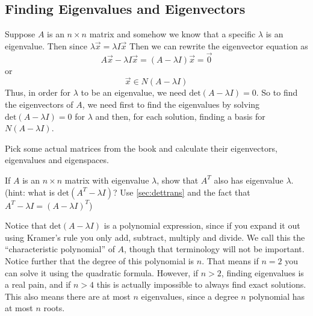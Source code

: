 \documentclass[Main.tex]{subfiles}
\begin{document}
\subsection{Finding Eigenvalues and Eigenvectors}

Suppose $A$ is an $n\times n$ matrix and somehow we know that a specific $\lambda$ is an eigenvalue.
Then since $\lambda\vec{x}=\lambda I \vec{x}$
Then we can rewrite the eigenvector equation as
\[A\vec{x}-\lambda I\vec{x} = (A-\lambda I)\vec{x} = \vec{0}\]
or
\[\vec{x}\in N(A-\lambda I)\]
Thus, in order for $\lambda$ to be an eigenvalue, we need $\mbox{det}(A-\lambda I)=0$.
So to find the eigenvectors of $A$, we need first to find the eigenvalues by solving $\mbox{det}(A-\lambda I)=0$ for $\lambda$ and then, for each solution, finding a basis for $N(A-\lambda I)$.  

\begin{ImpEx}
  Pick some actual matrices from the book and calculate their eigenvectors, eigenvalues and eigenspaces.
\end{ImpEx}

\begin{Ex}
  \label{sec:eigentrans}
  If $A$ is an $n\times n$ matrix with eigenvalue $\lambda$, show that $A^T$ also has eigenvalue $\lambda$. 
  (hint: what is $\mbox{det}(A^T-\lambda I)$?  Use \ref{sec:dettrans} and the fact that $A^T-\lambda I=(A-\lambda I)^T$)
\end{Ex}

Notice that $\mbox{det}(A-\lambda I)$ is a polynomial expression, since if you expand it out using Kramer's rule you only add, subtract, multiply and divide.
We call this the ``characteristic polynomial'' of $A$, though that terminology will not be important.  
Notice further that the degree of this polynomial is $n$.
That means if $n=2$ you can solve it using the quadratic formula.
However, if $n>2$, finding eigenvalues is a real pain, and if $n>4$ this is actually impossible to always find exact solutions.  
This also means there are at most $n$ eigenvalues, since a degree $n$ polynomial has at most $n$ roots.  
\end{document}
